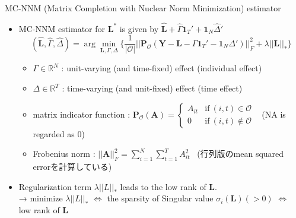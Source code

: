 \documentclass[xcolor=svgnames,aspectratio=169]{beamer}
\newcommand{\R}{\mathbb{R}}
\begin{document}
\begin{frame}{MC-NNM (Matrix Completion with Nuclear Norm Minimization) estimator}
    \begin{itemize}
        \item MC-NNM estimator for $\mathbf{L^*}$ is given by $\mathbf{\hat{L}}+\hat{\Gamma}\mathbf{1}_T' + \mathbf{1}_N\hat{\Delta}'$
        \[
        (\mathbf{\hat{L}}, \hat{\Gamma}, \hat{\Delta})=\arg \min_{\mathbf{L},\Gamma,\Delta} 
        \{
            \frac{1}{|\mathcal{O} |}  ||\mathbf{P_{\mathcal{O} }}({\mathbf{Y}-\mathbf{L}-\Gamma}\mathbf{1}_T'-\mathbf{1}_N\Delta')||_F^2+\lambda||\mathbf{L}||_*
        \}
        \]
        \begin{itemize}
            \item $\Gamma\in\R^N$ : unit-varying (and time-fixed) effect (individual effect)
            \item $\Delta\in\R^T$ : time-varying (and unit-fixed) effect (time effect) 
            \item matrix indicator function : $\mathbf{P_{\mathcal{O} }}(\mathbf{A})=
            \begin{cases}
                A_{it} & \text{if} \ (i,t)\in\mathcal{O} \\ 0 & \text{if} \ (i,t) \notin \mathcal{O}  
            \end{cases}$ \ (NA is regarded as $0$)
            \item Frobenius norm : $||\mathbf{A}||_F^2=\sum_{i=1}^N\sum_{t=1}^T A_{it}^2$ \ (行列版のmean squared errorを計算している)
        \end{itemize}
        \item Regularization term $\lambda||L||_*$ leads to \alert{the low rank of $\mathbf{L}$}. \\
        → minimize $\lambda||L||_*$ $\Leftrightarrow $ the sparsity of Singular value $\sigma_i(\mathbf{L})(>0)$ $\Leftrightarrow $ low rank of $\mathbf{L}$
    \end{itemize}
\end{frame}
\end{document}
